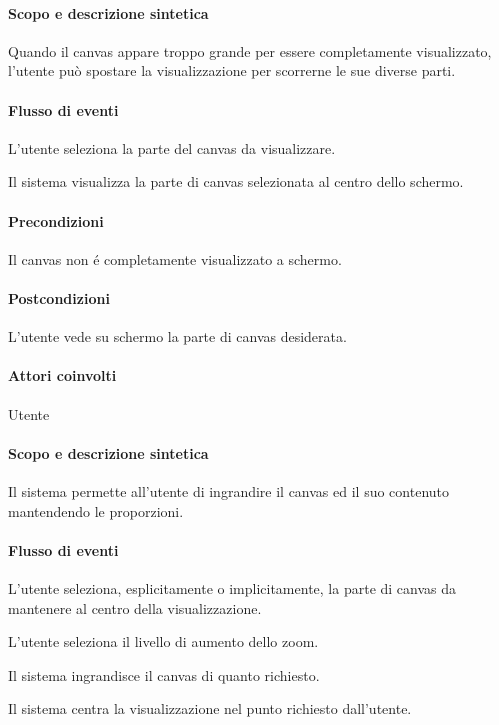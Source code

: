 \paragraph{Scopo e descrizione sintetica}
Quando il canvas appare troppo grande per essere completamente visualizzato, l'utente pu\`o spostare la visualizzazione per scorrerne le sue diverse parti.
\paragraph{Flusso di eventi}
\begin{elenconumerato}[\textbf{}]{\subsubsecindent}
\item L'utente seleziona la parte del canvas da visualizzare.
\item Il sistema visualizza la parte di canvas selezionata al centro dello schermo.
\end{elenconumerato}
\paragraph{Precondizioni} Il canvas non \'e completamente visualizzato a schermo.
\paragraph{Postcondizioni} L'utente vede su schermo la parte di canvas desiderata.

\paragraph{Attori coinvolti} Utente
\paragraph{Scopo e descrizione sintetica} 
Il sistema permette all'utente di ingrandire il canvas ed il suo contenuto mantendendo le proporzioni.
\paragraph{Flusso di eventi}
\begin{elenconumerato}[\textbf{}]{\subsubsecindent}
\item L'utente seleziona, esplicitamente o implicitamente, la parte di canvas da mantenere al centro della visualizzazione.
\item L'utente seleziona il livello di aumento dello zoom.
\item Il sistema ingrandisce il canvas di quanto richiesto.
\item Il sistema centra la visualizzazione nel punto richiesto dall'utente.
\end{elenconumerato}
